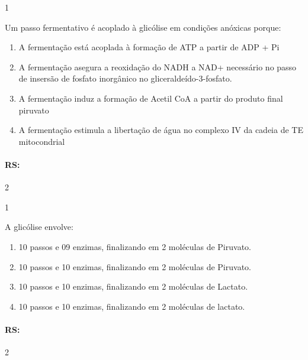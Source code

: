 \documentclass[\mainfilename]{subfiles}
\begin{document}
\begin{questionBox}1{}
    
    Um passo fermentativo é acoplado à glicólise em condições anóxicas porque:

    \begin{enumerate}
        \item A fermentação está acoplada à formação de ATP a partir de ADP + Pi 
        \item A fermentação asegura a reoxidação  do NADH a NAD+  necessário  no passo de insersão de fosfato inorgânico  no gliceraldeído-3-fosfato.   
        \item A fermentação induz a formação de Acetil CoA a partir do produto final piruvato 
        \item A fermentação estimula a libertação de água no complexo IV da cadeia de TE mitocondrial
    \end{enumerate}

    \paragraph{RS:} 2
    
\end{questionBox}

\begin{questionBox}1{}
    
    A glicólise envolve:
    \begin{enumerate}
        \item 10 passos e 09 enzimas, finalizando em 2 moléculas de Piruvato.
        \item 10 passos e 10 enzimas, finalizando em 2 moléculas de Piruvato.
        \item 10 passos e 10 enzimas, finalizando em 2 moléculas de Lactato.
        \item 10 passos e 10 enzimas, finalizando em 2 moléculas de lactato.
    \end{enumerate}

    \paragraph{RS:} 2
    
\end{questionBox}
\end{document}
